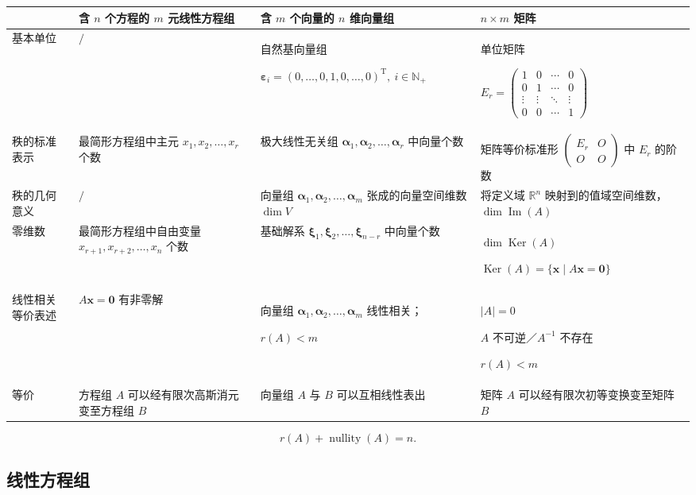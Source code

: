 \documentclass[UTF8,fontset=fandol,zihao=5]{ctexart}
\newcommand{\R}{\mathbb{R}}
\newcommand{\N}{\mathbb{N}}
\newcommand{\Ker}{\operatorname{Ker}}
\newcommand{\Img}{\operatorname{Im}}
\newcommand{\nullity}{\operatorname{nullity}}
\begin{document}
\small
\begin{longtable}{|>{\centering\arraybackslash}p{2.55cm}|>{\centering\arraybackslash}p{4.0cm}|>{\centering\arraybackslash}p{5.2cm}|>{\centering\arraybackslash}p{4.2cm}|}
\hline
& 含 $n$ 个方程的 $m$ 元线性方程组 & 含 $m$ 个向量的 $n$ 维向量组 & $n\times m$ 矩阵\\
\hline
基本单位
& $/$
& 自然基向量组

$\bm\varepsilon_i=(0,\ldots,0,1,0,\ldots,0)^{\mathrm T},\ i\in\N_+$
& 单位矩阵

$\displaystyle E_r=\begin{pmatrix}
1&0&\cdots&0\\0&1&\cdots&0\\\vdots&\vdots&\ddots&\vdots\\0&0&\cdots&1
\end{pmatrix}$\\
\hline
秩的标准表示
& 最简形方程组中主元 $x_1,x_2,\ldots,x_r$ 个数
& 极大线性无关组 $\bm\alpha_1,\bm\alpha_2,\ldots,\bm\alpha_r$ 中向量个数
& 矩阵等价标准形 $\begin{pmatrix}E_r&O\\O&O\end{pmatrix}$ 中 $E_r$ 的阶数\\
\hline
秩的几何意义
& $/$
& 向量组 $\bm\alpha_1,\bm\alpha_2,\ldots,\bm\alpha_m$ 张成的向量空间维数 $\dim V$
& 将定义域 $\R^n$ 映射到的值域空间维数，$\dim\Img(A)$\\
\hline
零维数
& 最简形方程组中自由变量 $x_{r+1},x_{r+2},\ldots,x_n$ 个数
& 基础解系 $\bm\xi_1,\bm\xi_2,\ldots,\bm\xi_{n-r}$ 中向量个数
& $\dim\Ker(A)$

$\Ker(A)=\{\bm x\mid A\bm x=\bm0\}$\\
\hline
线性相关等价表述
& $A\bm x=\bm0$ 有非零解
& 向量组 $\bm\alpha_1,\bm\alpha_2,\ldots,\bm\alpha_m$ 线性相关；

$r(A)<m$
& $|A|=0$

$A$ 不可逆／$A^{-1}$ 不存在

$r(A)<m$\\
\hline
等价
& 方程组 $A$ 可以经有限次高斯消元变至方程组 $B$
& 向量组 $A$ 与 $B$ 可以互相线性表出
& 矩阵 $A$ 可以经有限次初等变换变至矩阵 $B$\\
\hline
\end{longtable}
\normalsize

\begin{method}[【公式】秩—零维数公式]
\[
r(A)+\nullity(A)=n.
\]
\end{method}

\subsection{线性方程组}
\end{document}
